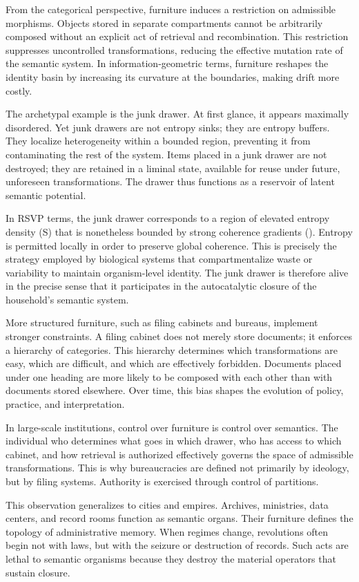 \documentclass[11pt,oneside]{article}
\begin{document}
From the categorical perspective, furniture induces a restriction on admissible morphisms. Objects stored in separate compartments cannot be arbitrarily composed without an explicit act of retrieval and recombination. This restriction suppresses uncontrolled transformations, reducing the effective mutation rate of the semantic system. In information-geometric terms, furniture reshapes the identity basin by increasing its curvature at the boundaries, making drift more costly.

The archetypal example is the junk drawer. At first glance, it appears maximally disordered. Yet junk drawers are not entropy sinks; they are entropy buffers. They localize heterogeneity within a bounded region, preventing it from contaminating the rest of the system. Items placed in a junk drawer are not destroyed; they are retained in a liminal state, available for reuse under future, unforeseen transformations. The drawer thus functions as a reservoir of latent semantic potential.

In RSVP terms, the junk drawer corresponds to a region of elevated entropy density (S) that is nonetheless bounded by strong coherence gradients (\nabla \Phi). Entropy is permitted locally in order to preserve global coherence. This is precisely the strategy employed by biological systems that compartmentalize waste or variability to maintain organism-level identity. The junk drawer is therefore alive in the precise sense that it participates in the autocatalytic closure of the household’s semantic system.

More structured furniture, such as filing cabinets and bureaus, implement stronger constraints. A filing cabinet does not merely store documents; it enforces a hierarchy of categories. This hierarchy determines which transformations are easy, which are difficult, and which are effectively forbidden. Documents placed under one heading are more likely to be composed with each other than with documents stored elsewhere. Over time, this bias shapes the evolution of policy, practice, and interpretation.

In large-scale institutions, control over furniture is control over semantics. The individual who determines what goes in which drawer, who has access to which cabinet, and how retrieval is authorized effectively governs the space of admissible transformations. This is why bureaucracies are defined not primarily by ideology, but by filing systems. Authority is exercised through control of partitions.

This observation generalizes to cities and empires. Archives, ministries, data centers, and record rooms function as semantic organs. Their furniture defines the topology of administrative memory. When regimes change, revolutions often begin not with laws, but with the seizure or destruction of records. Such acts are lethal to semantic organisms because they destroy the material operators that sustain closure.
\end{document}
